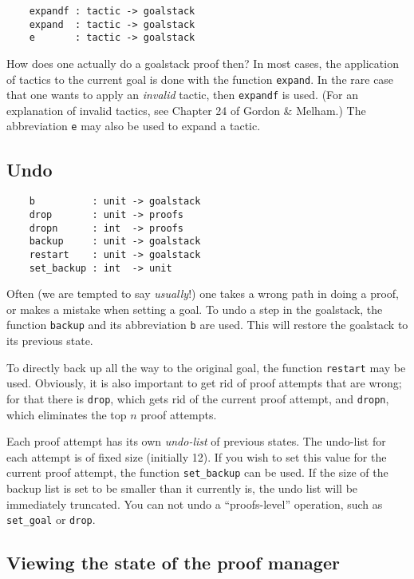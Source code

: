 \begin{verbatim}
    expandf : tactic -> goalstack
    expand  : tactic -> goalstack
    e       : tactic -> goalstack
\end{verbatim}

How does one actually do a goalstack proof then? In most cases, the
application of tactics to the current goal is done with the function
\verb+expand+. In the rare case that one wants to apply an
{\it invalid\/} tactic, then \verb+expandf+ is used. (For an
explanation of invalid tactics, see Chapter 24 of Gordon \& Melham.) The
abbreviation \verb+e+ may also be used to expand a tactic.


\subsection{Undo}

\begin{verbatim}
    b          : unit -> goalstack
    drop       : unit -> proofs
    dropn      : int  -> proofs
    backup     : unit -> goalstack
    restart    : unit -> goalstack
    set_backup : int  -> unit
\end{verbatim}

Often (we are tempted to say {\it usually}!) one takes a wrong path
in doing a proof, or makes a mistake when setting a goal. To undo a step
in the goalstack, the function \verb+backup+ and its abbreviation
\verb+b+ are used. This will restore the goalstack to its previous
state.


To directly back up all the way to the original goal, the function
\verb+restart+ may be used. Obviously, it is also important to get
rid of proof attempts that are wrong; for that there is \verb+drop+,
which gets rid of the current proof attempt, and \verb+dropn+, which
eliminates the top $n$ proof attempts.


Each proof attempt has its own {\it undo-list\/} of previous
states. The undo-list for each attempt is of fixed size (initially
12). If you wish to set this value for the current proof attempt, the
function \verb+set_backup+ can be used. If the size of the backup
list is set to be smaller than it currently is, the undo list will be
immediately truncated. You can not undo a ``proofs-level'' operation, such
as \verb+set_goal+ or \verb+drop+.

\subsection{Viewing the state of the proof manager}


